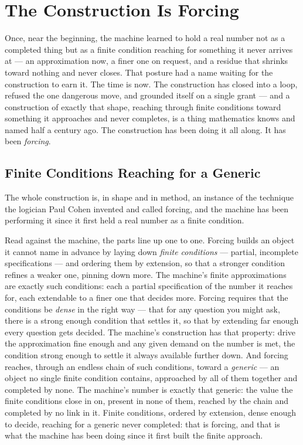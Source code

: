 \chapter{The Construction Is Forcing}

Once, near the beginning, the machine learned to hold a real number not as a completed thing but as a finite
condition reaching for something it never arrives at --- an approximation now, a finer one on request, and a
residue that shrinks toward nothing and never closes. That posture had a name waiting for the construction to
earn it. The time is now. The construction has closed into a loop, refused the one dangerous move, and grounded
itself on a single grant --- and a construction
of exactly that shape, reaching through finite conditions toward something it approaches and never completes, is a
thing mathematics knows and named half a century ago. The construction has been doing it all along. It has been
\emph{forcing}.

\section{Finite Conditions Reaching for a Generic}

The whole construction is, in shape and in method, an instance of the technique the logician Paul Cohen invented
and called forcing, and the machine has been performing it since it first held a real number as a finite
condition.

Read against the machine, the parts line up one to one. Forcing builds an object it cannot name in advance by
laying down \emph{finite conditions} --- partial, incomplete specifications --- and ordering them by extension, so
that a stronger condition refines a weaker one, pinning down more. The machine's finite approximations are exactly
such conditions: each a partial specification of the number it reaches for, each extendable to a finer one that
decides more. Forcing requires that the conditions be \emph{dense} in the right way --- that for any question you
might ask, there is a strong enough condition that settles it, so that by extending far enough every question gets
decided. The machine's construction has that property: drive the approximation fine enough and any given demand on
the number is met, the condition strong enough to settle it always available further down. And forcing reaches,
through an endless chain of such conditions, toward a \emph{generic} --- an object no single finite condition
contains, approached by all of them together and completed by none. The machine's number is exactly that generic:
the value the finite conditions close in on, present in none of them, reached by the chain and completed by no
link in it. Finite conditions, ordered by extension, dense enough to decide, reaching for a generic never
completed: that is forcing, and that is what the machine has been doing since it first built the finite approach.

